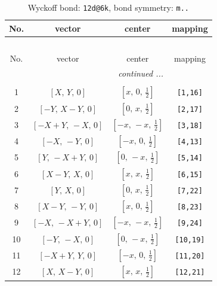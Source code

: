 \documentclass[fleqn,8pt]{jsarticle}
\begin{document}
\begin{longtable}{cccc}
\caption{Wyckoff bond: {\tt 12d@6k}, bond symmetry: {\tt m..}}
 \\
 \hline \hline
No. & vector & center & mapping \\ \hline \endfirsthead

\multicolumn{3}{l}{\tablename\ \thetable{}} \\
 \hline \hline
No. & vector & center & mapping \\ \hline \endhead

 \hline \hline
\multicolumn{3}{r}{\footnotesize\it continued ...} \\ \endfoot

 \hline \hline
\multicolumn{3}{r}{} \\ \endlastfoot

1 & $\left[ X,\, Y,\, 0 \right]$ & $\left[ x,\, 0,\, \frac{1}{2} \right]$ & {\tt [1,16]} \\ \hline
2 & $\left[ - Y,\, X - Y,\, 0 \right]$ & $\left[ 0,\, x,\, \frac{1}{2} \right]$ & {\tt [2,17]} \\ \hline
3 & $\left[ - X + Y,\, - X,\, 0 \right]$ & $\left[ - x,\, - x,\, \frac{1}{2} \right]$ & {\tt [3,18]} \\ \hline
4 & $\left[ - X,\, - Y,\, 0 \right]$ & $\left[ - x,\, 0,\, \frac{1}{2} \right]$ & {\tt [4,13]} \\ \hline
5 & $\left[ Y,\, - X + Y,\, 0 \right]$ & $\left[ 0,\, - x,\, \frac{1}{2} \right]$ & {\tt [5,14]} \\ \hline
6 & $\left[ X - Y,\, X,\, 0 \right]$ & $\left[ x,\, x,\, \frac{1}{2} \right]$ & {\tt [6,15]} \\ \hline
7 & $\left[ Y,\, X,\, 0 \right]$ & $\left[ 0,\, x,\, \frac{1}{2} \right]$ & {\tt [7,22]} \\ \hline
8 & $\left[ X - Y,\, - Y,\, 0 \right]$ & $\left[ x,\, 0,\, \frac{1}{2} \right]$ & {\tt [8,23]} \\ \hline
9 & $\left[ - X,\, - X + Y,\, 0 \right]$ & $\left[ - x,\, - x,\, \frac{1}{2} \right]$ & {\tt [9,24]} \\ \hline
10 & $\left[ - Y,\, - X,\, 0 \right]$ & $\left[ 0,\, - x,\, \frac{1}{2} \right]$ & {\tt [10,19]} \\ \hline
11 & $\left[ - X + Y,\, Y,\, 0 \right]$ & $\left[ - x,\, 0,\, \frac{1}{2} \right]$ & {\tt [11,20]} \\ \hline
12 & $\left[ X,\, X - Y,\, 0 \right]$ & $\left[ x,\, x,\, \frac{1}{2} \right]$ & {\tt [12,21]} \\
\end{longtable}
\end{document}

